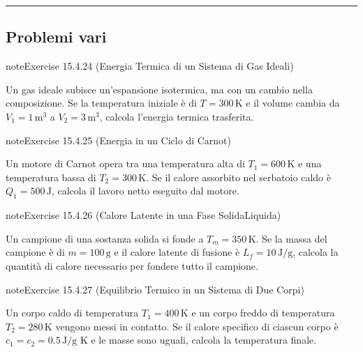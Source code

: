 \documentclass[letterpaper,10pt,italian]{jupyterBook}
\begin{document}
\bigskip\hrule\bigskip



\subsection{Problemi vari}
\label{\detokenize{ch/thermodynamics/matter-problems:problemi-vari}} \label{exercise:ch/thermodynamics/matter-problems-exercise-23}

\begin{sphinxadmonition}{note}{Exercise 15.4.24 (Energia Termica di un Sistema di Gas Ideali)}



\sphinxAtStartPar
Un gas ideale subisce un’espansione isotermica, ma con un cambio nella composizione. Se la temperatura iniziale è di \(T = 300 \, \text{K}\) e il volume cambia da \(V_1 = 1 \, \text{m}^3\) a \(V_2 = 3 \, \text{m}^3\), calcola l’energia termica trasferita.
\end{sphinxadmonition}
 \label{exercise:ch/thermodynamics/matter-problems-exercise-24}

\begin{sphinxadmonition}{note}{Exercise 15.4.25 (Energia in un Ciclo di Carnot)}



\sphinxAtStartPar
Un motore di Carnot opera tra una temperatura alta di \(T_1 = 600 \, \text{K}\) e una temperatura bassa di \(T_2 = 300 \, \text{K}\). Se il calore assorbito nel serbatoio caldo è \(Q_1 = 500 \, \text{J}\), calcola il lavoro netto eseguito dal motore.
\end{sphinxadmonition}
 \label{exercise:ch/thermodynamics/matter-problems-exercise-25}

\begin{sphinxadmonition}{note}{Exercise 15.4.26 (Calore Latente in una Fase Solida\sphinxhyphen{}Liquida)}



\sphinxAtStartPar
Un campione di una sostanza solida si fonde a \(T_m = 350 \, \text{K}\). Se la massa del campione è di \(m = 100 \, \text{g}\) e il calore latente di fusione è \(L_f = 10 \, \text{J/g}\), calcola la quantità di calore necessario per fondere tutto il campione.
\end{sphinxadmonition}
 \label{exercise:ch/thermodynamics/matter-problems-exercise-26}

\begin{sphinxadmonition}{note}{Exercise 15.4.27 (Equilibrio Termico in un Sistema di Due Corpi)}



\sphinxAtStartPar
Un corpo caldo di temperatura \(T_1 = 400 \, \text{K}\) e un corpo freddo di temperatura \(T_2 = 280 \, \text{K}\) vengono messi in contatto. Se il calore specifico di ciascun corpo è \(c_1 = c_2 = 0.5 \, \text{J/g K}\) e le masse sono uguali, calcola la temperatura finale.
\end{sphinxadmonition}
 \label{exercise:ch/thermodynamics/matter-problems-exercise-27}
\end{document}
